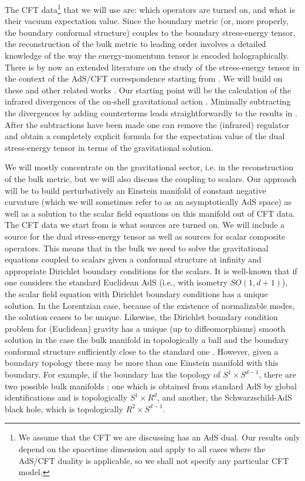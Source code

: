 \documentclass{article}
\begin{document}
The CFT data\footnote{We assume that the 
CFT we are discussing has an AdS dual.
Our results only depend on the spacetime 
dimension and apply to all cases where the AdS/CFT duality 
is applicable, so we shall not specify any particular
CFT model.} that we will use are: which 
operators are turned on, and what is their vacuum 
expectation value. Since the boundary metric (or, more properly,
the boundary conformal structure) couples to the boundary 
stress-energy tensor, the reconstruction of the 
bulk metric to leading order involves a detailed
knowledge of the way the energy-momentum  tensor 
is encoded holographically. 
There is by now an extended literature on the 
study of the stress-energy tensor in the context of the 
AdS/CFT correspondence starting from \cite{BK,Myers}.
We will build on these and other related works \cite{EJM,Mann,KLS}. 
Our starting point will be the calculation of the 
infrared divergences of the on-shell gravitational action
\cite{HS}. Minimally subtracting the divergences 
by adding counterterms \cite{HS} leads straightforwardly to the 
results in \cite{BK,EJM,KLS}. After the subtractions 
have been made one can remove the (infrared) regulator
and obtain a completely explicit formula for
the expectation value of the dual 
stress-energy tensor in terms of the gravitational solution.

We will mostly concentrate on the gravitational sector,
i.e. in the reconstruction of the bulk metric, 
but we will also discuss the coupling to scalars. 
Our approach will be to build perturbatively an Einstein manifold 
of constant negative curvature (which we will sometimes 
refer to as an asymptotically 
AdS space) as well as a solution to the scalar field equations
on this manifold out of CFT data. The CFT data we start from 
is what sources are turned on. We will include 
a source for the dual stress-energy tensor as well 
as sources for scalar composite operators. 
This means that in the bulk we need to solve the 
gravitational equations coupled to scalars 
given a conformal structure at infinity and 
appropriate Dirichlet boundary conditions for the 
scalars. It is well-known that if one considers the standard Euclidean AdS 
(i.e., with isometry $SO(1,d+1)$), the scalar field
equation with Dirichlet boundary conditions 
has a unique solution. In the Lorentzian case,
because of the existence of normalizable modes, the 
solution ceases to be unique. Likewise,
the Dirichlet boundary condition problem 
for (Euclidean) gravity has a unique (up to diffeomorphisms)
smooth solution in the case the bulk manifold in 
topologically a ball and the boundary conformal 
structure sufficiently close to the standard one \cite{GrahamLee}.
However, given a boundary topology there may be 
more than one Einstein manifold with this boundary. 
For example, if the boundary has the topology
of $S^1 \times S^{d-1}$, there are two possible bulk manifolds
\cite{PageH,Wit}:
one which is obtained from standard AdS by global identifications
and is topologically $S^1 \times R^d$,
and another, the Schwarzschild-AdS black hole, 
which is topologically $R^2 \times S^{d-1}$.
\end{document}
